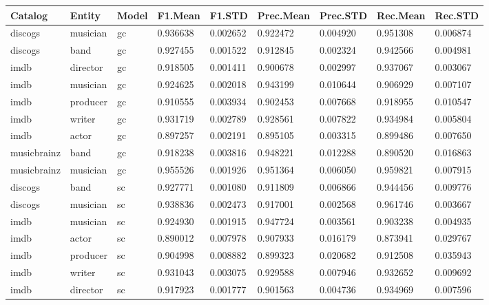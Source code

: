 \documentclass[epsfig,a4paper,11pt,titlepage,twoside,openany]{book}
\begin{document}
\begin{longtable}{|l|l|l|l|l|l|l|l|l|}
\hline
Catalog     & Entity   & Model                    & F1.Mean  & F1.STD   & Prec.Mean & Prec.STD & Rec.Mean & Rec.STD \\ \hline
discogs     & musician & gc        & 0.936638 & 0.002652 & 0.922472  & 0.004920 & 0.951308    & 0.006874   \\
discogs     & band     & gc        & 0.927455 & 0.001522 & 0.912845  & 0.002324 & 0.942566    & 0.004981   \\
imdb        & director & gc        & 0.918505 & 0.001411 & 0.900678  & 0.002997 & 0.937067    & 0.003067   \\
imdb        & musician & gc        & 0.924625 & 0.002018 & 0.943199  & 0.010644 & 0.906929    & 0.007107   \\
imdb        & producer & gc        & 0.910555 & 0.003934 & 0.902453  & 0.007668 & 0.918955    & 0.010547   \\
imdb        & writer   & gc        & 0.931719 & 0.002789 & 0.928561  & 0.007822 & 0.934984    & 0.005804   \\
imdb        & actor    & gc        & 0.897257 & 0.002191 & 0.895105  & 0.003315 & 0.899486    & 0.007650   \\
musicbrainz & band     & gc        & 0.918238 & 0.003816 & 0.948221  & 0.012288 & 0.890520    & 0.016863   \\
musicbrainz & musician & gc        & 0.955526 & 0.001926 & 0.951364  & 0.006050 & 0.959821    & 0.007915   \\ \hline
discogs     & band     & sc      & 0.927771 & 0.001080 & 0.911809  & 0.006866 & 0.944456    & 0.009776   \\
discogs     & musician & sc      & 0.938836 & 0.002473 & 0.917001  & 0.002568 & 0.961746    & 0.003667   \\
imdb        & musician & sc      & 0.924930 & 0.001915 & 0.947724  & 0.003561 & 0.903238    & 0.004935   \\
imdb        & actor    & sc      & 0.890012 & 0.007978 & 0.907933  & 0.016179 & 0.873941    & 0.029767   \\
imdb        & producer & sc      & 0.904998 & 0.008882 & 0.899323  & 0.020682 & 0.912508    & 0.035943   \\
imdb        & writer   & sc      & 0.931043 & 0.003075 & 0.929588  & 0.007946 & 0.932652    & 0.009692   \\
imdb        & director & sc      & 0.917923 & 0.001777 & 0.901563  & 0.004736 & 0.934969    & 0.007596   \\

\end{longtable}
\end{document}
